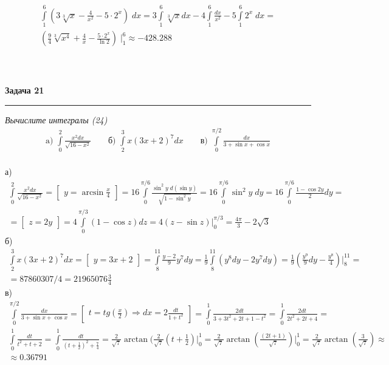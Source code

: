 \documentclass[a4paper,11pt]{article}
\begin{document}
\begin{gather*}
\int\limits_1^6 (3 \sqrt[3]{x} - \frac{4}{x^2} - 5 \cdot 2^x) \; dx = 
3\int\limits_1^6 \sqrt[3]{x}dx - 4\int\limits_1^6 \frac{dx}{x^2} - 5 \int\limits_1^6 2^x \; dx = \\[2pt]
(\frac94 \sqrt[3]{x^4} + \frac{4}{x} - \frac{5 \cdot 2^{x}}{\ln 2}) \; \big |_{1}^{6} \approx -428.288
\end{gather*}
\\ \\ \\








\textbf{\large Задача 21}
\medskip\hrule\medskip
\textit{Вычислите интегралы (24)}
\begin{align*}
\text{a) } \int\limits_0^2 \frac{x^2dx}{\sqrt{16 - x^2}} \qquad \text{б) } \int\limits_2^3 x(3x + 2)^7dx
\qquad \text{в) } \int\limits_0^{\pi/2} \frac{dx}{3 + \sin x + \cos x}
\end{align*} \\
а)
\begin{gather*}
\int\limits_0^2 \frac{x^2dx}{\sqrt{16 - x^2}} = 
\begin{bmatrix} y = \arcsin \frac{x}4\end{bmatrix} = 
16\int\limits_0^{\pi / 6} \frac{\sin^2y \; d(\sin y)}{\sqrt{1 - \sin^2y}} = 
16\int\limits_0^{\pi / 6} \sin^2y \; dy = 
16 \int\limits_0^{\pi / 6} \frac{1 - \cos 2y}{2}dy = \\[2pt]
= \begin{bmatrix} z = 2y \end{bmatrix} = 
4 \int\limits_0^{\pi / 3} (1 - \cos z)dz = 4(z - \sin z) \big |_{0}^{\pi / 3} = \frac{4\pi}3 - 2\sqrt{3} 
\end{gather*}
б)
\begin{gather*}
\int\limits_2^3 x(3x + 2)^7dx = 
\begin{bmatrix} y = 3x + 2 \end{bmatrix} = 
\int\limits_{8}^{11} \frac{y - 2}9 y^7dy = 
\frac19\int\limits_{8}^{11}(y^8 dy - 2y^7 dy) = 
\frac19(\frac{y^9}{9} dy - \frac{y^8}{4})\big |_{8}^{11} = \\[2pt]
= 87860307/4 = 21965076 \frac34
\end{gather*}
в)
\begin{gather*}
\int\limits_0^{\pi/2} \frac{dx}{3 + \sin x + \cos x} = 
\begin{bmatrix} t = tg(\frac{x}2) \Rightarrow dx = 2\frac{dt}{1 + t^2} \end{bmatrix} = 
\int\limits_0^1 \frac{2dt}{3 + 3t^2 + 2t + 1 - t^2} =
\int\limits_0^1 \frac{2dt}{2t^2 + 2t + 4} =\\[2pt]
\int\limits_0^1 \frac{dt}{t^2 + t + 2} =    
\int\limits_0^1 \frac{dt}{(t + \frac12)^2 + \frac74} =   
\frac2{\sqrt{7}} \arctan(\frac2{\sqrt{7}}(t + \frac12) \big |_{0}^{1} =
\frac2{\sqrt{7}} \arctan(\frac{(2t + 1)}{\sqrt{7}}) \big |_{0}^{1} =
\frac2{\sqrt{7}} \arctan(\frac{3}{\sqrt{7}}) \approx  \\ \approx 0.36791
\end{gather*}
\end{document}

